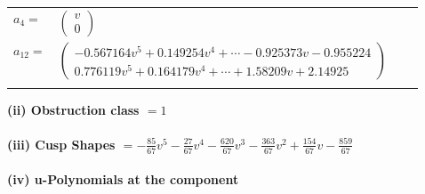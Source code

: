 \documentclass[1p]{elsarticle_modified}
\theoremstyle{definition}
\begin{document}
\begin{tabular}{m{7pt} m{180pt} m{7pt} m{180pt} }
\flushright $a_{4}=$&$\begin{pmatrix}v\\0\end{pmatrix}$ \\
\flushright $a_{12}=$&$\begin{pmatrix}-0.567164 v^{5}+0.149254 v^{4}+\cdots-0.925373 v-0.955224\\0.776119 v^{5}+0.164179 v^{4}+\cdots+1.58209 v+2.14925\end{pmatrix}$\\&\end{tabular}
\flushleft \textbf{(ii) Obstruction class $= 1$}\\~\\
\flushleft \textbf{(iii) Cusp Shapes $= -\frac{85}{67} v^5-\frac{27}{67} v^4-\frac{620}{67} v^3-\frac{363}{67} v^2+\frac{154}{67} v-\frac{859}{67}$}\\~\\
\newpage\renewcommand{\arraystretch}{1}
\flushleft \textbf{(iv) u-Polynomials at the component}\newline \\
\end{document}
